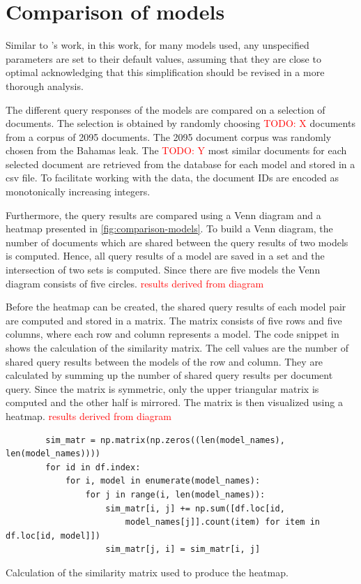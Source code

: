 \section{Comparison of models}\label{sec:evaluation-models}

Similar to \citeauthor{glove2014}'s work, in this work, for many models used, any unspecified parameters are set to their default values, 
assuming that they are close to optimal
acknowledging that this simplification should be revised in a more thorough analysis.

The different query responses of the models are compared on a selection of documents.
The selection is obtained by randomly choosing \textcolor{red}{TODO: X} documents from a corpus of 2095 documents.
The 2095 document corpus was randomly chosen from the Bahamas leak.
The \textcolor{red}{TODO: Y} most similar documents for each selected document are retrieved from the database for each model and stored in a \ac{csv} file.
To facilitate working with the data, the document IDs are encoded as monotonically increasing integers.

Furthermore, the query results are compared using a Venn diagram and a heatmap presented in \autoref{fig:comparison-models}.
To build a Venn diagram, the number of documents which are shared between the query results of two models is computed.
Hence, all query results of a model are saved in a set and the intersection of two sets is computed.
Since there are five models the Venn diagram consists of five circles.
\textcolor{red}{results derived from diagram}

Before the heatmap can be created, the shared query results of each model pair are computed and stored in a matrix.
The matrix consists of five rows and five columns, where each row and column represents a model.
The code snippet in  shows the calculation of the similarity matrix.
The cell values are the number of shared query results between the models of the row and column.
They are calculated by summing up the number of shared query results per document query.
Since the matrix is symmetric, only the upper triangular matrix is computed and the other half is mirrored.
The matrix is then visualized using a heatmap.
\textcolor{red}{results derived from diagram}

\begin{listing}[htp]
    \begin{verbatim}
        sim_matr = np.matrix(np.zeros((len(model_names), len(model_names))))
        for id in df.index:
            for i, model in enumerate(model_names):
                for j in range(i, len(model_names)):
                    sim_matr[i, j] += np.sum([df.loc[id, 
                        model_names[j]].count(item) for item in df.loc[id, model]])
                    sim_matr[j, i] = sim_matr[i, j]
    \end{verbatim}
    \caption{Calculation of the similarity matrix used to produce the heatmap.
    }
    \label{lst:sim-matrix}
\end{listing}

